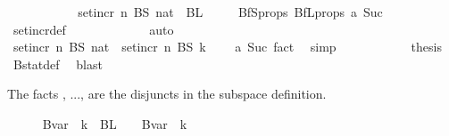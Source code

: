 \begin{isabellebody}
\ \ \ \ \ \ \ \ \isamarkupfalse%
\ \isamarkupfalse%
\ {\isachardoublequoteopen}set{\isacharunderscore}{\kern0pt}incr\ n\ {\isacharparenleft}{\kern0pt}BS\ nat{\isacharparenright}{\kern0pt}\ {\isasyminter}\ BL\ {}\ {\isacharequal}{\kern0pt}\ {\isacharbraceleft}{\kern0pt}{\isacharbraceright}{\kern0pt}{\isachardoublequoteclose}\ \isamarkupfalse%
\ BfS{\isacharunderscore}{\kern0pt}props\ BfL{\isacharunderscore}{\kern0pt}props\ a\ Suc\ \isamarkupfalse%
\ set{\isacharunderscore}{\kern0pt}incr{\isacharunderscore}{\kern0pt}def\ \isanewline
\ \ \ \ \ \ \ \ \ \ \isamarkupfalse%
\ auto\isanewline
\ \ \ \ \ \ \ \ \isamarkupfalse%
\ \isamarkupfalse%
\ {\isachardoublequoteopen}set{\isacharunderscore}{\kern0pt}incr\ n\ {\isacharparenleft}{\kern0pt}BS\ nat{\isacharparenright}{\kern0pt}\ {\isasyminter}\ set{\isacharunderscore}{\kern0pt}incr\ n\ {\isacharparenleft}{\kern0pt}BS\ k{\isacharparenright}{\kern0pt}\ {\isacharequal}{\kern0pt}\ {\isacharbraceleft}{\kern0pt}{\isacharbraceright}{\kern0pt}{\isachardoublequoteclose}\ \isamarkupfalse%
\ a\ Suc\ fact{}\ \isamarkupfalse%
\ simp\isanewline
\ \ \ \ \ \ \ \ \isamarkupfalse%
\ \isamarkupfalse%
\ {\isacharquery}{\kern0pt}thesis\ \isamarkupfalse%
\ Bstat{\isacharunderscore}{\kern0pt}def\ \isamarkupfalse%
\ blast\isanewline
\ \ \ \ \ \ \isamarkupfalse%
\isanewline
\ \ \ \ \isamarkupfalse%
%
\begin{isamarkuptext}%
The facts , ...,  are the disjuncts in the subspace definition.%
\end{isamarkuptext}\isamarkuptrue%
\ \ \ \ \isamarkupfalse%
\ {\isachardoublequoteopen}Bvar\ {\isacharbackquote}{\kern0pt}\ {\isacharbraceleft}{\kern0pt}{\isachardot}{\kern0pt}{\isachardot}{\kern0pt}{\isacharless}{\kern0pt}k{\isacharplus}{\kern0pt}{}{\isacharbraceright}{\kern0pt}\ {\isacharequal}{\kern0pt}\ BL\ {\isacharbackquote}{\kern0pt}\ {\isacharbraceleft}{\kern0pt}{\isachardot}{\kern0pt}{\isachardot}{\kern0pt}{\isacharless}{\kern0pt}{}{\isacharbraceright}{\kern0pt}\ {\isasymunion}\ Bvar\ {\isacharbackquote}{\kern0pt}\ {\isacharbraceleft}{\kern0pt}{}{\isachardot}{\kern0pt}{\isachardot}{\kern0pt}{\isacharless}{\kern0pt}k{\isacharplus}{\kern0pt}{}{\isacharbraceright}{\kern0pt}{\isachardoublequoteclose}\ \isamarkupfalse%

\end{isabellebody}
